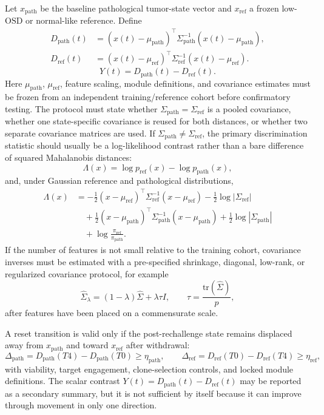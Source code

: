 \documentclass[11pt,a4paper]{article}
\newcommand{\OSD}{\ensuremath{\mathrm{OSD}}}
\newcommand{\1}{\mathbf{1}}
\begin{document}
Let $x_{\mathrm{path}}$ be the baseline pathological tumor-state vector and $x_{\mathrm{ref}}$ a frozen low-\OSD{} or normal-like reference. Define
\[
\begin{aligned}
  D_{\mathrm{path}}(t)
  &=
  (x(t)-\mu_{\mathrm{path}})^\top
  \Sigma_{\mathrm{path}}^{-1}
  (x(t)-\mu_{\mathrm{path}}),\\
  D_{\mathrm{ref}}(t)
  &=
  (x(t)-\mu_{\mathrm{ref}})^\top
  \Sigma_{\mathrm{ref}}^{-1}
  (x(t)-\mu_{\mathrm{ref}}).
\end{aligned}
\]
\[
  Y(t)=D_{\mathrm{path}}(t)-D_{\mathrm{ref}}(t).
\]
Here $\mu_{\mathrm{path}}$, $\mu_{\mathrm{ref}}$, feature scaling, module definitions, and covariance estimates must be frozen from an independent training/reference cohort before confirmatory testing. The protocol must state whether $\Sigma_{\mathrm{path}}=\Sigma_{\mathrm{ref}}$ is a pooled covariance, whether one state-specific covariance is reused for both distances, or whether two separate covariance matrices are used. If $\Sigma_{\mathrm{path}}\neq\Sigma_{\mathrm{ref}}$, the primary discrimination statistic should usually be a log-likelihood contrast rather than a bare difference of squared Mahalanobis distances:
\[
  \Lambda(x)=\log p_{\mathrm{ref}}(x)-\log p_{\mathrm{path}}(x),
\]
and, under Gaussian reference and pathological distributions,
\[
\begin{aligned}
  \Lambda(x)
  &=
  -\frac{1}{2}(x-\mu_{\mathrm{ref}})^\top
  \Sigma_{\mathrm{ref}}^{-1}
  (x-\mu_{\mathrm{ref}})
  -\frac{1}{2}\log|\Sigma_{\mathrm{ref}}|\\
  &\quad
  +\frac{1}{2}(x-\mu_{\mathrm{path}})^\top
  \Sigma_{\mathrm{path}}^{-1}
  (x-\mu_{\mathrm{path}})
  +\frac{1}{2}\log|\Sigma_{\mathrm{path}}|\\
  &\quad
  +\log\frac{\pi_{\mathrm{ref}}}{\pi_{\mathrm{path}}}.
\end{aligned}
\]
If the number of features is not small relative to the training cohort, covariance inverses must be estimated with a pre-specified shrinkage, diagonal, low-rank, or regularized covariance protocol, for example
\[
  \widehat{\Sigma}_\lambda=(1-\lambda)\widehat{\Sigma}+\lambda\tau I,
  \qquad
  \tau=\frac{\mathrm{tr}(\widehat{\Sigma})}{p},
\]
after features have been placed on a commensurate scale.

A reset transition is valid only if the post-rechallenge state remains displaced away from $x_{\mathrm{path}}$ and toward $x_{\mathrm{ref}}$ after withdrawal:
\[
  \Delta_{\mathrm{path}}
  =
  D_{\mathrm{path}}(T4)-D_{\mathrm{path}}(T0)
  \geq \eta_{\mathrm{path}},
  \qquad
  \Delta_{\mathrm{ref}}
  =
  D_{\mathrm{ref}}(T0)-D_{\mathrm{ref}}(T4)
  \geq \eta_{\mathrm{ref}},
\]
with viability, target engagement, clone-selection controls, and locked module definitions. The scalar contrast $Y(t)=D_{\mathrm{path}}(t)-D_{\mathrm{ref}}(t)$ may be reported as a secondary summary, but it is not sufficient by itself because it can improve through movement in only one direction.
\end{document}
